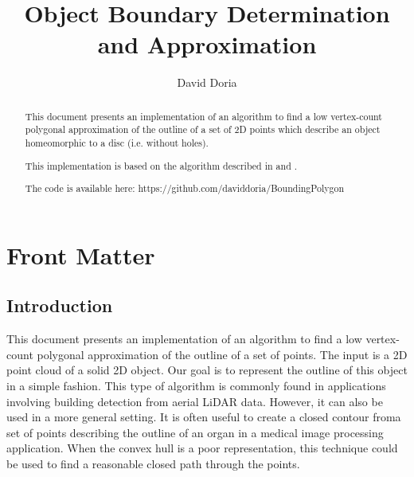 \documentclass{InsightArticle}
\title{Object Boundary Determination and Approximation}
\author{David Doria}
\newcommand{\IJhandlerIDnumber}{3250}
\begin{document}
\IJhandlefooter{\IJhandlerIDnumber}


\ifpdf
\else
\fi


\maketitle


\ifhtml
\chapter*{Front Matter\label{front}}
\fi

\begin{abstract}
\noindent

This document presents an implementation of an algorithm to find a low vertex-count polygonal approximation of the outline of a set of 2D points which describe an object homeomorphic to a disc (i.e. without holes).

This implementation is based on the algorithm described in \cite{WangThesis} and \cite{WangPaper}.

The code is available here:
https://github.com/daviddoria/BoundingPolygon

\end{abstract}

\IJhandlenote{\IJhandlerIDnumber}

\tableofcontents
\section{Introduction}
This document presents an implementation of an algorithm to find a low vertex-count polygonal approximation of the outline of a set of points. The input is a 2D point cloud of a solid 2D object. Our goal is to represent the outline of this object in a simple fashion. This type of algorithm is commonly found in applications involving building detection from aerial LiDAR data. However, it can also be used in a more general setting. It is often useful to create a closed contour froma set of points describing the outline of an organ in a medical image processing application. When the convex hull is a poor representation, this technique could be used to find a reasonable closed path through the points. 
\end{document}
